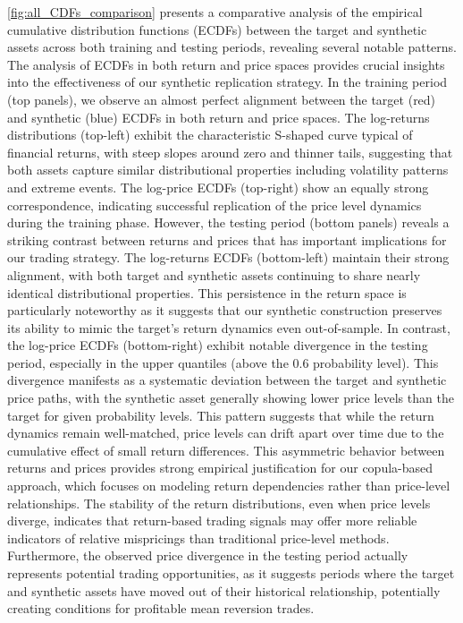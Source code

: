 

\cref{fig:all_CDFs_comparison} presents a comparative analysis of the empirical cumulative distribution functions (ECDFs) between the target and synthetic assets across both training and testing periods, revealing several notable patterns. The analysis of ECDFs in both return and price spaces provides crucial insights into the effectiveness of our synthetic replication strategy.
In the training period (top panels), we observe an almost perfect alignment between the target (red) and synthetic (blue) ECDFs in both return and price spaces. The log-returns distributions (top-left) exhibit the characteristic S-shaped curve typical of financial returns, with steep slopes around zero and thinner tails, suggesting that both assets capture similar distributional properties including volatility patterns and extreme events. The log-price ECDFs (top-right) show an equally strong correspondence, indicating successful replication of the price level dynamics during the training phase.
However, the testing period (bottom panels) reveals a striking contrast between returns and prices that has important implications for our trading strategy. The log-returns ECDFs (bottom-left) maintain their strong alignment, with both target and synthetic assets continuing to share nearly identical distributional properties. This persistence in the return space is particularly noteworthy as it suggests that our synthetic construction preserves its ability to mimic the target's return dynamics even out-of-sample.
In contrast, the log-price ECDFs (bottom-right) exhibit notable divergence in the testing period, especially in the upper quantiles (above the 0.6 probability level). This divergence manifests as a systematic deviation between the target and synthetic price paths, with the synthetic asset generally showing lower price levels than the target for given probability levels. This pattern suggests that while the return dynamics remain well-matched, price levels can drift apart over time due to the cumulative effect of small return differences.
This asymmetric behavior between returns and prices provides strong empirical justification for our copula-based approach, which focuses on modeling return dependencies rather than price-level relationships. The stability of the return distributions, even when price levels diverge, indicates that return-based trading signals may offer more reliable indicators of relative mispricings than traditional price-level methods. Furthermore, the observed price divergence in the testing period actually represents potential trading opportunities, as it suggests periods where the target and synthetic assets have moved out of their historical relationship, potentially creating conditions for profitable mean reversion trades.

